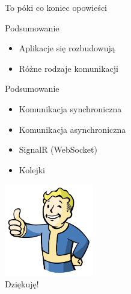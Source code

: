 \documentclass{beamer}
\begin{document}
\begin{frame}{}
	\begin{center}
		\Huge{To póki co koniec opowieści}
	\end{center}
\end{frame}

\begin{frame}{Podsumowanie}
	\begin{huge}
		\begin{itemize}[<+->]
			\item Aplikacje się rozbudowują
			\item Różne rodzaje komunikacji
		\end{itemize}
	\end{huge}
\end{frame}

\begin{frame}{Podsumowanie}
	\begin{huge}
		\begin{itemize}[<+->]
			\item Komunikacja synchroniczna
			\item Komunikacja asynchroniczna
			\item SignalR (WebSocket)
			\item Kolejki
		\end{itemize}
	\end{huge}
\end{frame}

\begin{frame}{}
	\begin{center}
  		\includegraphics[height=4cm]{ok.png} \\
		\Huge{Dziękuję!}
	\end{center}
\end{frame}
\end{document}

